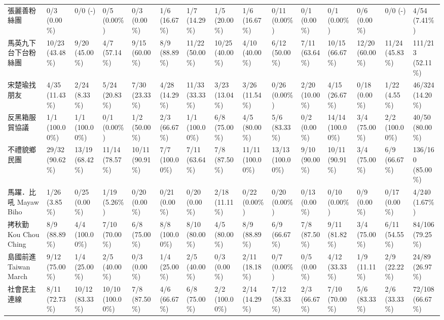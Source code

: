 \documentclass[letterpaper, 10pt, conference]{ieeeconf}   %
\begin{document}
\begin{CJK}{UTF8}{bsmi}
\begin{landscape}
\begin{longtable}[c]{@{}L{2.45cm}L{1.1cm}L{1.1cm}L{1.1cm}L{1.1cm}L{1.1cm}L{1.1cm}L{1.1cm}L{1.1cm}L{1.1cm}L{1.1cm}L{1.1cm}L{1.1cm}L{1.1cm}L{1.1cm}@{}}
張麗善粉絲團 & 0/3 (0.00\%) & 0/0 (-) & 0/5 (0.00\%) & 0/3 (0.00\%) & 1/6 (16.67\%) & 1/7 (14.29\%) & 1/5 (20.00\%) & 1/6 (16.67\%) & 0/11 (0.00\%) & 0/1 (0.00\%) & 0/1 (0.00\%) & 0/6 (0.00\%) & 0/0 (-) & 4/54 (7.41\%) \\
馬英九下台下台粉絲團 & 10/23 (43.48\%) & 9/20 (45.00\%) & 4/7 (57.14\%) & 9/15 (60.00\%) & 8/9 (88.89\%) & 11/22 (50.00\%) & 10/25 (40.00\%) & 4/10 (40.00\%) & 6/12 (50.00\%) & 7/11 (63.64\%) & 10/15 (66.67\%) & 12/20 (60.00\%) & 11/24 (45.83\%) & 111/213 (52.11\%) \\
宋楚瑜找朋友 & 4/35 (11.43\%) & 2/24 (8.33\%) & 5/24 (20.83\%) & 7/30 (23.33\%) & 4/28 (14.29\%) & 11/33 (33.33\%) & 3/23 (13.04\%) & 3/26 (11.54\%) & 0/26 (0.00\%) & 2/20 (10.00\%) & 4/15 (26.67\%) & 0/18 (0.00\%) & 1/22 (4.55\%) & 46/324 (14.20\%) \\
反黑箱服貿協議 & 1/1 (100.00\%) & 1/1 (100.00\%) & 0/1 (0.00\%) & 1/2 (50.00\%) & 2/3 (66.67\%) & 1/1 (100.00\%) & 6/8 (75.00\%) & 4/5 (80.00\%) & 5/6 (83.33\%) & 0/2 (0.00\%) & 14/14 (100.00\%) & 3/4 (75.00\%) & 2/2 (100.00\%) & 40/50 (80.00\%) \\
不禮貌鄉民團 & 29/32 (90.62\%) & 13/19 (68.42\%) & 11/14 (78.57\%) & 10/11 (90.91\%) & 7/7 (100.00\%) & 7/11 (63.64\%) & 7/8 (87.50\%) & 11/11 (100.00\%) & 13/13 (100.00\%) & 9/10 (90.00\%) & 10/11 (90.91\%) & 3/4 (75.00\%) & 6/9 (66.67\%) & 136/160 (85.00\%) \\
馬躍．比吼 Mayaw Biho & 1/26 (3.85\%) & 0/25 (0.00\%) & 1/19 (5.26\%) & 0/20 (0.00\%) & 0/21 (0.00\%) & 0/20 (0.00\%) & 2/18 (11.11\%) & 0/22 (0.00\%) & 0/20 (0.00\%) & 0/13 (0.00\%) & 0/10 (0.00\%) & 0/9 (0.00\%) & 0/17 (0.00\%) & 4/240 (1.67\%) \\
拷秋勤 Kou Chou Ching & 8/9 (88.89\%) & 4/4 (100.00\%) & 7/10 (70.00\%) & 6/8 (75.00\%) & 8/8 (100.00\%) & 8/10 (80.00\%) & 4/5 (80.00\%) & 8/9 (88.89\%) & 6/9 (66.67\%) & 7/8 (87.50\%) & 9/11 (81.82\%) & 3/4 (75.00\%) & 6/11 (54.55\%) & 84/106 (79.25\%) \\
島國前進 Taiwan March & 9/12 (75.00\%) & 1/4 (25.00\%) & 2/5 (40.00\%) & 0/3 (0.00\%) & 1/4 (25.00\%) & 2/5 (40.00\%) & 0/3 (0.00\%) & 2/11 (18.18\%) & 0/7 (0.00\%) & 0/5 (0.00\%) & 4/12 (33.33\%) & 1/9 (11.11\%) & 2/9 (22.22\%) & 24/89 (26.97\%) \\
社會民主連線 & 8/11 (72.73\%) & 10/12 (83.33\%) & 10/10 (100.00\%) & 7/8 (87.50\%) & 4/6 (66.67\%) & 6/8 (75.00\%) & 2/2 (100.00\%) & 2/14 (14.29\%) & 7/12 (58.33\%) & 2/3 (66.67\%) & 7/10 (70.00\%) & 5/6 (83.33\%) & 2/6 (33.33\%) & 72/108 (66.67\%) \\

\end{longtable}
\end{landscape}
\end{CJK}
\end{document}
